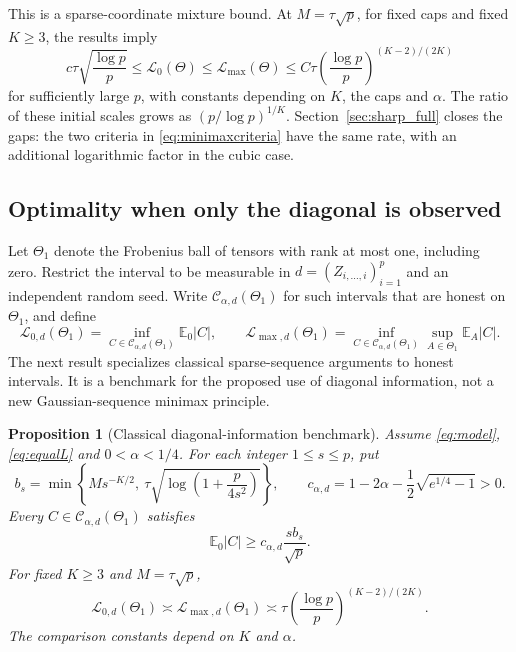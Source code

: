 \documentclass[11pt]{article}
\newtheorem{proposition}{Proposition}
\theoremstyle{remark}
\newcommand{\E}{\mathbb E}
\newcommand{\calL}{\mathcal L}
\begin{document}
This is a sparse-coordinate mixture bound. At $M=\tau\sqrt p$, for fixed caps and fixed $K\ge3$, the results imply
\begin{equation}\label{eq:gap}
 c\tau\sqrt{\frac{\log p}p}
 \le\calL_0(\Theta)\le\calL_{\max}(\Theta)
 \le C\tau\left(\frac{\log p}p\right)^{(K-2)/(2K)}
\end{equation}
for sufficiently large $p$, with constants depending on $K$, the caps and $\alpha$. The ratio of these initial scales grows as $(p/\log p)^{1/K}$. Section~\ref{sec:sharp_full} closes the gaps: the two criteria in \eqref{eq:minimaxcriteria} have the same rate, with an additional logarithmic factor in the cubic case.

\subsection{Optimality when only the diagonal is observed}\label{sec:diagonal_optimality}

Let $\Theta_1$ denote the Frobenius ball of tensors with rank at most one, including zero. Restrict the interval to be measurable in $d=(Z_{i,\ldots,i})_{i=1}^p$ and an independent random seed. Write $\mathcal C_{\alpha,d}(\Theta_1)$ for such intervals that are honest on $\Theta_1$, and define
\[
 \mathcal L_{0,d}(\Theta_1)=\inf_{C\in\mathcal C_{\alpha,d}(\Theta_1)}\E_0|C|,
 \qquad
 \mathcal L_{\max,d}(\Theta_1)
 =\inf_{C\in\mathcal C_{\alpha,d}(\Theta_1)}\sup_{A\in\Theta_1}\E_A|C|.
\]
The next result specializes classical sparse-sequence arguments \citep{cailownonconvex2004,collier2017} to honest intervals. It is a benchmark for the proposed use of diagonal information, not a new Gaussian-sequence minimax principle.

\begin{proposition}[Classical diagonal-information benchmark]\label{prop:diagonal_minimax}
Assume \eqref{eq:model}, \eqref{eq:equalL} and $0<\alpha<1/4$. For each integer $1\le s\le p$, put
\[
 b_s=\min\left\{M s^{-K/2},\
       \tau\sqrt{\log\left(1+\frac{p}{4s^2}\right)}\right\},
 \qquad
 c_{\alpha,d}=1-2\alpha-\frac12\sqrt{e^{1/4}-1}>0.
\]
Every $C\in\mathcal C_{\alpha,d}(\Theta_1)$ satisfies
\begin{equation}\label{eq:diagonal_lower}
 \E_0|C|\ge c_{\alpha,d}\frac{s b_s}{\sqrt p}.
\end{equation}
For fixed $K\ge3$ and $M=\tau\sqrt p$,
\begin{equation}\label{eq:diagonal_rate}
 \mathcal L_{0,d}(\Theta_1)\asymp
 \mathcal L_{\max,d}(\Theta_1)\asymp
 \tau\left(\frac{\log p}{p}\right)^{(K-2)/(2K)}.
\end{equation}
The comparison constants depend on $K$ and $\alpha$.
\end{proposition}
\end{document}
